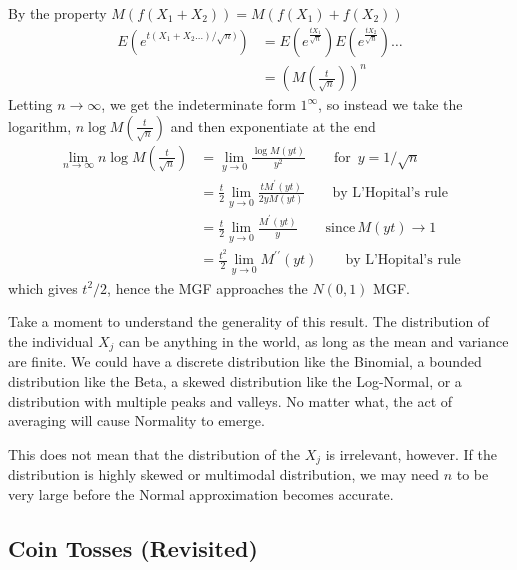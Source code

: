 By the property
\(M\left( f\left( X_{1} + X_{2} \right) \right) = M(f\left( X_{1} \right) + f\left( X_{2} \right))\)
\begin{equation}
\begin{split}
E\left( e^{t(X_{1} + X_{2}\ldots)/\sqrt{n})} \right) &= 
E\left( e^{\frac{tX_{1}}{\sqrt{n}}} \right)E\left( e^{\frac{tX_{2}}{\sqrt{n}}} \right)\ldots \\
&= \left( M\left( \frac{t}{\sqrt{n}} \right) \right)^{n}
\end{split}
\end{equation}
Letting \(n \rightarrow \infty\), 
we get the indeterminate form \(1^{\infty}\), 
so instead we take the logarithm,
\(n\log{M\left(\frac{t}{\sqrt{n}}\right)}\) and then exponentiate at the end
\begin{equation}
\begin{split}
\lim_{n \rightarrow \infty}{n\log{M\left( \frac{t}{\sqrt{n}} \right)}} &= 
\lim_{y \rightarrow 0}\frac{\log{M(yt)}}{y^{2}}\qquad \text{for}\,\,\,y = 1/\sqrt{n} \\
&= \frac{t}{2}\lim_{y \rightarrow 0}\frac{tM^{\prime}(yt)}{2yM(yt)}\qquad\text{by L'Hopital's rule}\\&= 
\frac{t}{2}\lim_{y \rightarrow 0}\frac{M^{\prime}(yt)}{y}\qquad \text{since}\,M(yt) \rightarrow 1\\
&= \frac{t^{2}}{2}\lim_{y \rightarrow 0}{M^{\prime\prime}(yt)}\qquad \text{by L'Hopital's rule}
\end{split}
\end{equation}
which gives \(t^{2}/2\), 
hence the MGF approaches the \(N(0,1)\) MGF.

Take a moment to understand the generality of this result. 
The distribution of the individual \(X_{j}\) can be anything in the world,
as long as the mean and variance are finite. 
We could have a discrete distribution like the Binomial, 
a bounded distribution like the Beta, 
a skewed distribution like the Log-Normal, 
or a distribution with multiple peaks and valleys. 
No matter what, 
the act of averaging will cause Normality to emerge.

This does not mean that the distribution of the \(X_{j}\) is irrelevant, 
however. 
If the distribution is highly skewed or multimodal distribution, 
we may need \(n\) to be very large before the Normal approximation becomes accurate.

\subsection{Coin Tosses (Revisited)}

